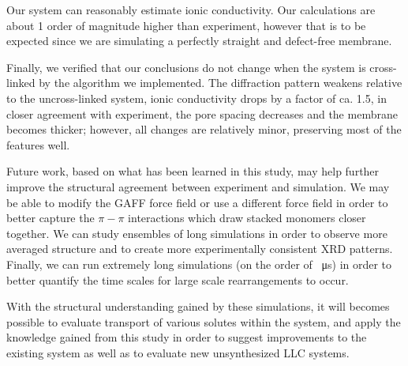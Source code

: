 \documentclass[journal=jpcbfk,manuscript=article]{achemso}
\begin{document}

  Our system can reasonably estimate ionic conductivity. Our
  calculations are about 1 order of magnitude higher than experiment, however
  that is to be expected since we are simulating a perfectly straight and
  defect-free membrane. 

  Finally, we verified that our conclusions do not change when the system is
  cross-linked by the algorithm we implemented. The diffraction pattern weakens
  relative to the uncross-linked system, 
  ionic conductivity drops by a factor
  of ca. 1.5, in closer agreement with experiment, the pore spacing decreases and
  the membrane becomes thicker; however, all changes are relatively minor, 
  preserving most of the features well.


  Future work, based on what has been learned in this study, may help further improve the 
  structural agreement between experiment and simulation. We may be able to 
  modify the GAFF force field or use a different force field in order to better
  capture the $\pi-\pi$ interactions which draw stacked monomers closer together. 
  We can study ensembles of long simulations in order to observe more averaged 
  structure and to create more experimentally consistent XRD patterns. Finally, we can
  run extremely long simulations (on the order of \SI{}{\micro s}) in order to better 
  quantify the time scales for large scale rearrangements to occur. 

  With the structural understanding gained by these simulations, it will becomes
  possible to evaluate transport of various solutes within the system, and apply the
  knowledge gained from this study in order to suggest improvements to the
  existing system as well as to evaluate new unsynthesized LLC systems.

  \clearpage
  
\end{document}
